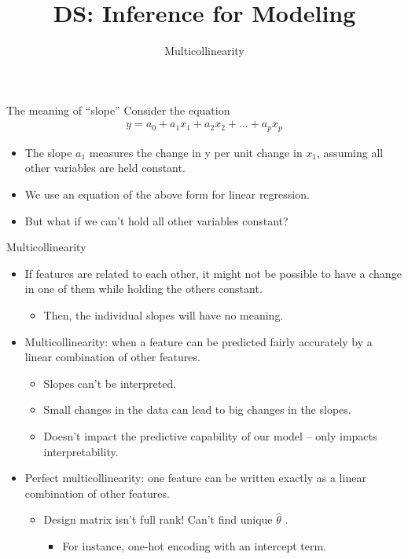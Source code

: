 \documentclass[aspectratio=169]{../latex_main/tntbeamer}  %
\title[Introduction]{DS: Inference for Modeling}
\subtitle{Multicollinearity}
\begin{document}
	
	\maketitle
	\begin{frame}{The meaning of “slope”}
	    Consider the equation
	    \begin{align*}
	        y = a_0 + a_1x_1 + a_2x_2 + ... + a_px_p 
	    \end{align*}
	    \begin{itemize}
	        \item The slope $a_1$ measures the change in y per unit change in $x_1$, assuming all other variables are held constant.
	        \item We use an equation of the above form for linear regression.
	        \item But what if we can’t hold all other variables constant?
	    \end{itemize}
	\end{frame}
	
	
	\begin{frame}{Multicollinearity}
	    \begin{itemize}
	        \item If features are related to each other, it might not be possible to have a change in one of them while holding the others constant.
	        \begin{itemize}
	            \item Then, the individual slopes will have no meaning.
	        \end{itemize}
	        \item Multicollinearity: when a feature can be predicted fairly accurately by a linear combination of other features.
	        \begin{itemize}
	            \item Slopes can’t be interpreted.
	            \item Small changes in the data can lead to big changes in the slopes.
	            \item Doesn’t impact the predictive capability of our model – only impacts interpretability.
	        \end{itemize}
	        \item Perfect multicollinearity: one feature can be written exactly as a linear combination of other features.
	        \begin{itemize}
	            \item Design matrix isn’t full rank! Can’t find unique   $\hat{\theta}$   .
	            \begin{itemize}
	                \item For instance, one-hot encoding with an intercept term. 
	            \end{itemize}
	        \end{itemize}
	    \end{itemize}
	\end{frame}
	
\end{document}
